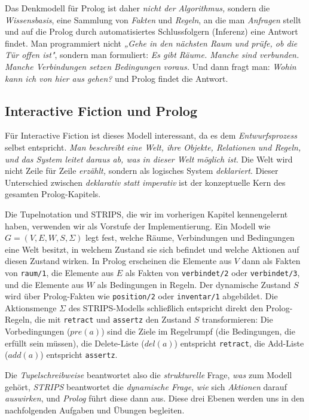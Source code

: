 \documentclass[parskip=half,a4paper,11pt]{scrreprt}
\begin{document}
Das Denkmodell für Prolog ist daher \textit{nicht der}\textit{ Algorithmus,} sondern die \textit{Wissensbasis}, eine Sammlung von \textit{Fakten} und \textit{Regeln}, an die man \textit{Anfragen} stellt und auf die Prolog durch automatisiertes Schlussfolgern (Inferenz) eine Antwort findet. Man programmiert nicht \textit{„Gehe in den nächsten Raum und prüfe, ob die Tür offen ist"}, sondern man formuliert: \textit{Es gibt Räume. Manche sind verbunden. Manche Verbindungen setzen Bedingungen voraus.} Und dann fragt man: \textit{Wohin kann ich von hier aus gehen?} und Prolog findet die Antwort. 

\subsection{Interactive Fiction und Prolog}

Für Interactive Fiction ist dieses Modell interessant, da es dem \textit{Entwurfsprozess }selbst entspricht. \textit{Man beschreibt eine Welt, ihre Objekte, Relationen und Regeln, und das System leitet daraus ab, was in dieser Welt möglich ist}. Die Welt wird nicht Zeile für Zeile\textit{ erzählt,} sondern als logisches System \textit{deklariert}. Dieser Unterschied zwischen \textit{deklarativ statt imperativ} ist der konzeptuelle Kern des gesamten Prolog-Kapitels.

Die Tupelnotation und STRIPS, die wir im vorherigen Kapitel  kennengelernt haben, verwenden wir als Vorstufe der Implementierung. Ein Modell wie $G=(V,E,W,S,\Sigma)$ legt fest, welche Räume, Verbindungen und Bedingungen eine Welt besitzt, in welchem Zustand sie sich befindet und welche Aktionen auf diesen Zustand wirken. In Prolog erscheinen die Elemente aus $V$ dann als Fakten von \texttt{raum/1}, die Elemente aus $E$ als Fakten von \texttt{verbindet/2} oder \texttt{verbindet/3}, und die Elemente aus $W$ als Bedingungen in Regeln. Der dynamische Zustand $S$ wird über Prolog-Fakten wie \texttt{position/2} oder \texttt{inventar/1} abgebildet. Die Aktionsmenge $\Sigma$ des STRIPS-Modells schließlich entspricht direkt den Prolog-Regeln, die mit \texttt{retract} und \texttt{assertz} den Zustand $S$ transformieren: Die Vorbedingungen ($pre(a)$) sind die Ziele im Regelrumpf (die Bedingungen, die erfüllt sein müssen), die Delete-Liste ($del(a)$) entspricht \texttt{retract}, die Add-Liste ($add(a)$) entspricht \texttt{assertz}. 

Die \textit{Tupelschreibweise} beantwortet also die \textit{strukturelle} Frage,\textit{ was} zum Modell gehört, \textit{STRIPS} beantwortet die\textit{ dynamische Frage}, \textit{wie} sich \textit{Aktionen} darauf \textit{auswirken}, und\textit{ Prolog }führt diese dann aus. Diese drei Ebenen werden uns in den nachfolgenden Aufgaben und Übungen begleiten.
\end{document}
